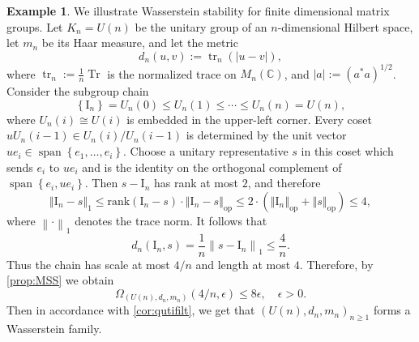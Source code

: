 \documentclass{amsart}
\numberwithin{equation}{subsection}
\theoremstyle{plain}
\theoremstyle{definition}
\newtheorem{exm}[exm]{Example}
\theoremstyle{plain}
\begin{document}
\begin{exm}\label{exm:findimunit}
We illustrate Wasserstein stability for finite dimensional matrix groups. Let \(K_{n}=U\left(n\right)\) be the unitary group of an \(n\)-dimensional Hilbert space, let \(m_{n}\) be its Haar measure, and let the metric
\[d_{n}\left(u,v\right):=\operatorname{tr}_{n}\left(\left|u-v\right|\right),\]
where \(\operatorname{tr}_{n}:=\frac{1}{n}\operatorname{Tr}\) is the normalized trace on \(M_{n}\left(\mathbb{C}\right)\), and \(\left|a\right|:=\left(a^{*}a\right)^{1/2}\). Consider the subgroup chain
\[\left\{\mathrm{I}_{n}\right\}=U_{n}\left(0\right)\leq U_{n}\left(1\right)\leq\dotsm\leq U_{n}\left(n\right)=U\left(n\right),\]
where \(U_{n}\left(i\right)\cong U\left(i\right)\) is embedded in the upper-left corner. Every coset \(uU_{n}\left(i-1\right)\in U_{n}\left(i\right)/U_{n}\left(i-1\right)\) is determined by the unit vector \(u e_{i}\in\operatorname{span}\left\{e_{1},\dotsc,e_{i}\right\}\). Choose a unitary representative \(s\) in this coset which sends \(e_{i}\) to \(u e_{i}\) and is the identity on the orthogonal complement of \(\operatorname{span}\left\{e_{i},u e_{i}\right\}\). Then \(s-\mathrm{I}_{n}\) has rank at most \(2\), and therefore
\[\left\Vert\mathrm{I}_{n}-s\right\Vert_{1}\leq\mathrm{rank}\left(\mathrm{I}_{n}-s\right)\cdot\left\Vert\mathrm{I}_{n}-s\right\Vert_{\text{op}}\leq2\cdot\left(\left\Vert\mathrm{I}_{n}\right\Vert_{\text{op}}+\left\Vert s\right\Vert_{\text{op}}\right)\leq4,\]
where \(\left\|\cdot\right\|_{1}\) denotes the trace norm. It follows that
\[d_{n}\left(\mathrm{I}_{n},s\right)=\frac{1}{n}\left\|s-\mathrm{I}_{n}\right\|_{1}\leq\frac{4}{n}.\]
Thus the chain has scale at most \(4/n\) and length at most \(4\). Therefore, by \cref{prop:MSS} we obtain
\[\Omega_{\left(U\left(n\right),d_{n},m_{n}\right)}\left(4/n,\epsilon\right)\leq8\epsilon,\quad\epsilon>0.\]
Then in accordance with \cref{cor:qutifilt}, we get that \(\left(U\left(n\right),d_{n},m_{n}\right)_{n\geq 1}\) forms a Wasserstein family.
\end{exm}
\end{document}
